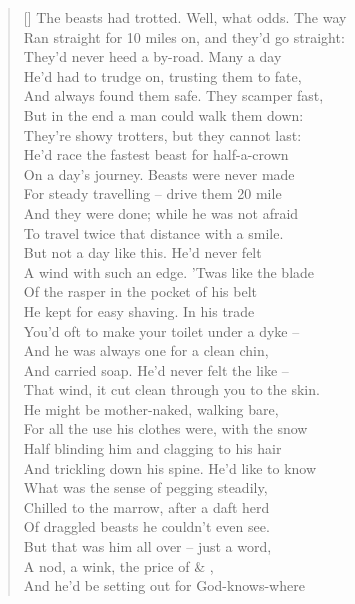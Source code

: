 \documentclass[MAIN]{subfiles}
\begin{document}
\begin{verse}[\versewidth]
The beasts had trotted. Well, what odds. The way\\
Ran straight for 10 miles on, and they'd go straight:\\
They'd never heed a by-road. Many a day\\
He'd had to trudge on, trusting them to fate,\\
And always found them safe. They scamper fast,\\
But in the end a man could walk them down:\\
They're showy trotters, but they cannot last:\\
He'd race the fastest beast for half-a-crown\\
On a day's journey. Beasts were never made\\
For steady travelling -- drive them 20 mile\\
And they were done; while he was not afraid\\
To travel twice that distance with a smile.\\
But not a day like this. He'd never felt\\
A wind with such an edge. 'Twas like the blade\\
Of the rasper in the pocket of his belt\\
He kept for easy shaving. In his trade\\
You'd oft to make your toilet under a dyke --\\
And he was always one for a clean chin,\\
And carried soap. He'd never felt the like --\\
That wind, it cut clean through you to the skin.\\
He might be mother-naked, walking bare,\\
For all the use his clothes were, with the snow\\
Half blinding him and clagging to his hair\\
And trickling down his spine. He'd like to know\\
What was the sense of pegging steadily,\\
Chilled to the marrow, after a daft herd\\
Of draggled beasts he couldn't even see.\\
But that was him all over -- just a word,\\
A nod, a wink, the price of  \& ,\\
And he'd be setting out for God-knows-where\\

\end{verse}
\end{document}
